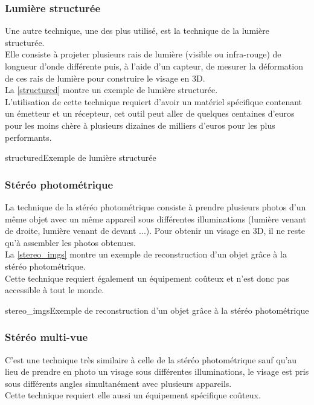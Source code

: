 \documentclass[poster]{polytech/polytech}
\begin{document}
\subsubsection{Lumière structurée}
\label{struc_light}
Une autre technique, une des plus utilisé, est la technique de la lumière structurée.\\
Elle consiste à projeter plusieurs rais de lumière (visible ou infra-rouge) de longueur d'onde différente puis, à l'aide d'un capteur, de mesurer la déformation de ces rais de lumière pour construire le visage en 3D.\\
La \autoref{structured} montre un exemple de lumière structurée.\\
L'utilisation de cette technique requiert d'avoir un matériel spécifique contenant un émetteur et un récepteur, cet outil peut aller de quelques centaines d'euros pour les moins chère à plusieurs dizaines de milliers d'euros pour les plus performants.

\begin{Figure}{structured}{Exemple de lumière structurée}
\end{Figure}

\subsubsection{Stéréo photométrique}
\label{photo_stereo}
La technique de la stéréo photométrique consiste à prendre plusieurs photos d'un même objet avec un même appareil sous différentes illuminations (lumière venant de droite, lumière venant de devant ...). Pour obtenir un visage en 3D, il ne reste qu'à assembler les photos obtenues.\\
La \autoref{stereo_imgs} montre un exemple de reconstruction d'un objet grâce à la stéréo photométrique.\\
Cette technique requiert également un équipement coûteux et n'est donc pas accessible à tout le monde.

\begin{Figure}{stereo_imgs}{Exemple de reconstruction d'un objet grâce à la stéréo photométrique}
\end{Figure}


\subsubsection{Stéréo multi-vue}
\label{multi_stereo}
C'est une technique très similaire à celle de la stéréo photométrique sauf qu'au lieu de prendre en photo un visage sous différentes illuminations, le visage est pris sous différents angles simultanément avec plusieurs appareils.\\
Cette technique requiert elle aussi un équipement spécifique coûteux.\\
\\
\\
\end{document}
